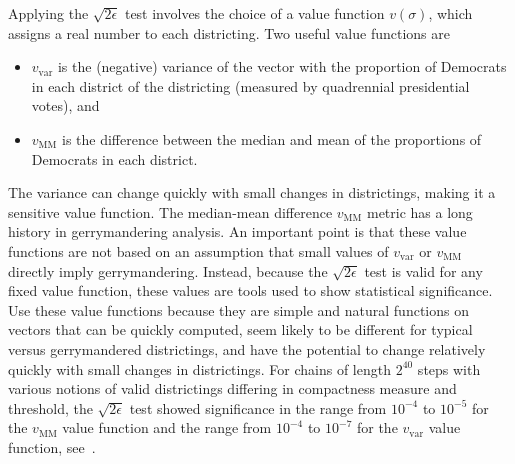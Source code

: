\documentclass[12pt]{article}
\begin{document}
Applying the \( \sqrt{2\epsilon} \) test involves the choice of a value
function \( v(\sigma) \), which assigns a real number to each
districting.  Two useful value functions are
\begin{itemize}
    \item
        \( v_{\text{var}} \) is the (negative) variance of the vector with
        the proportion of Democrats in each district of the districting
        (measured by quadrennial presidential votes), and
    \item
        \( v_{\text{MM}} \) is the difference between the median and
        mean of the proportions of Democrats in each district.
\end{itemize}
The variance can change quickly with small changes in districtings,
making it a sensitive value function.  The median-mean difference \( v_{\text
{MM}} \) metric has a long history in gerrymandering analysis.  An
important point is that these value functions are not based on an
assumption that small values of \( v_{\text {var}} \) or \( v_{\text{MM}}
\) directly imply gerrymandering.  Instead, because the \( \sqrt{2\epsilon}
\) test is valid for any fixed value function, these values are tools
used to show statistical significance.  Use these value functions
because they are simple and natural functions on vectors that can be
quickly computed, seem likely to be different for typical versus
gerrymandered districtings, and have the potential to change relatively
quickly with small changes in districtings.  For chains of length \( 2^{40}
\) steps with various notions of valid districtings differing in
compactness measure and threshold, the \( \sqrt{2\epsilon} \) test
showed significance in the range from \( 10^{-4} \) to \( 10^ {-5} \)
for the \( v_{\text {MM}} \) value function and the range from \( 10^{-4}
\) to \( 10^{-7} \) for the \( v_{\text{var}} \) value function,
see~\cite{chikina2860si}.
\end{document}
